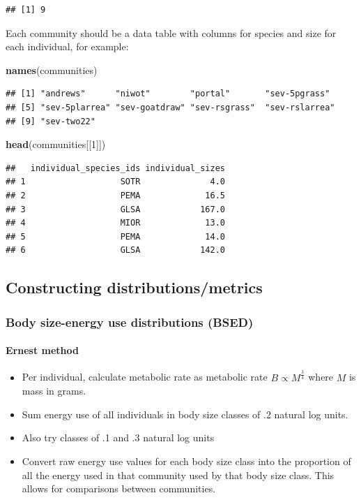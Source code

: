 \documentclass[]{article}
\newenvironment{Shaded}{\begin{snugshade}}{\end{snugshade}}
\newcommand{\KeywordTok}[1]{\textcolor[rgb]{0.13,0.29,0.53}{\textbf{#1}}}
\newcommand{\DecValTok}[1]{\textcolor[rgb]{0.00,0.00,0.81}{#1}}
\newcommand{\NormalTok}[1]{#1}
\providecommand{\tightlist}{%
  \setlength{\itemsep}{0pt}\setlength{\parskip}{0pt}}
\let\oldparagraph\paragraph
\renewcommand{\paragraph}[1]{\oldparagraph{#1}\mbox{}}
\begin{document}
\begin{verbatim}
## [1] 9
\end{verbatim}

Each community should be a data table with columns for species and size
for each individual, for example:

\begin{Shaded}
\begin{Highlighting}[]
\KeywordTok{names}\NormalTok{(communities)}
\end{Highlighting}
\end{Shaded}

\begin{verbatim}
## [1] "andrews"      "niwot"        "portal"       "sev-5pgrass" 
## [5] "sev-5plarrea" "sev-goatdraw" "sev-rsgrass"  "sev-rslarrea"
## [9] "sev-two22"
\end{verbatim}

\begin{Shaded}
\begin{Highlighting}[]
\KeywordTok{head}\NormalTok{(communities[[}\DecValTok{1}\NormalTok{]])}
\end{Highlighting}
\end{Shaded}

\begin{verbatim}
##   individual_species_ids individual_sizes
## 1                   SOTR              4.0
## 2                   PEMA             16.5
## 3                   GLSA            167.0
## 4                   MIOR             13.0
## 5                   PEMA             14.0
## 6                   GLSA            142.0
\end{verbatim}

\subsection{Constructing
distributions/metrics}\label{constructing-distributionsmetrics}

\subsubsection{Body size-energy use distributions
(BSED)}\label{body-size-energy-use-distributions-bsed}

\paragraph{Ernest method}\label{ernest-method}

\begin{itemize}
\tightlist
\item
  Per individual, calculate metabolic rate as metabolic rate
  \(B \propto M^\frac{3}{4}\) where \(M\) is mass in grams.
\item
  Sum energy use of all individuals in body size classes of .2 natural
  log units.
\item
  Also try classes of .1 and .3 natural log units
\item
  Convert raw energy use values for each body size class into the
  proportion of all the energy used in that community used by that body
  size class. This allows for comparisons between communities.
\end{itemize}
\end{document}

